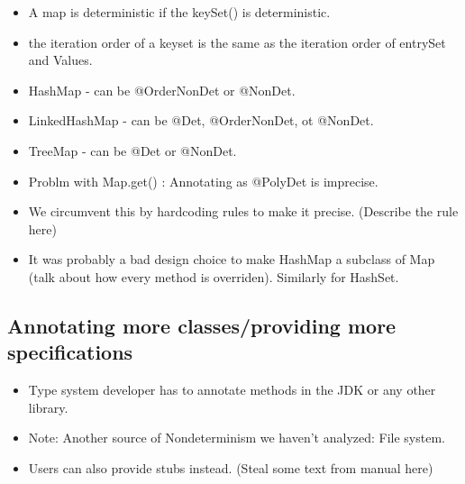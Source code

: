 \begin{itemize}
	\item A map is deterministic if the keySet() is deterministic.
	\item the iteration order of a keyset is the same as the iteration order of entrySet and Values.
	\item HashMap - can be @OrderNonDet or @NonDet.
	\item LinkedHashMap - can be @Det, @OrderNonDet, ot @NonDet.
	\item TreeMap - can be @Det or @NonDet.
	\item Problm with Map.get() : Annotating as @PolyDet is imprecise.
	\item We circumvent this by hardcoding rules to make it precise. (Describe the rule here)
	\item It was probably a bad design choice to make HashMap a subclass of Map (talk about how
	every method is overriden). Similarly for HashSet.
\end{itemize}

\subsection{Annotating more classes/providing more specifications}
\begin{itemize}
	\item Type system developer has to annotate methods in the JDK or any other library.
	\item Note: Another source of Nondeterminism we haven't analyzed: File system.
	\item Users can also provide stubs instead. (Steal some text from manual here)
\end{itemize}
